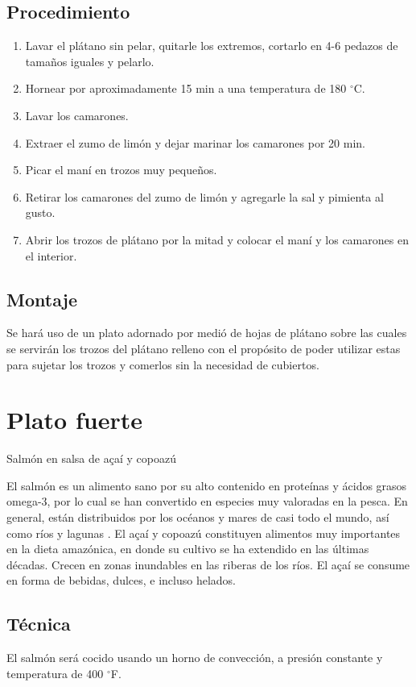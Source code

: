 \documentclass{scrartcl}
\newcommand{\msection}[2]{\section{#1}{\color{Maroon}\fontspec{Zapfino.ttf}\begin{center}#2\end{center}}}
\begin{document}
	\subsection{Procedimiento}
	\begin{multicols}{2}
		\begin{enumerate}
			\item Lavar el plátano sin pelar, quitarle los extremos, cortarlo en 4-6 pedazos de tamaños iguales y pelarlo.
			\item Hornear por aproximadamente 15 min a una temperatura de 180 $^\circ$C.
			\item Lavar los camarones.
			\item Extraer el zumo de limón y dejar marinar los camarones por 20 min.
			\item Picar el maní en trozos muy pequeños.
			\item Retirar los camarones del zumo de limón y agregarle la sal y pimienta al gusto.
			\item Abrir los trozos de plátano por la mitad y colocar el maní y los camarones en el interior.
		\end{enumerate}
	\end{multicols}
	
	\subsection{Montaje}
		Se hará uso de un plato adornado por medió de hojas de plátano sobre las cuales se servirán los trozos del plátano relleno con el propósito de poder utilizar estas para sujetar los trozos y comerlos sin la necesidad de cubiertos.
	
	\msection{Plato fuerte}{Salm\'on en salsa de a\c{c}a\'i y copoazú}
		El salmón es un alimento sano por su alto contenido en proteínas y ácidos grasos omega-3, por lo cual se han convertido en especies muy valoradas en la pesca. En general, est\'an distribuidos por los océanos y mares de casi todo el mundo, as\'i como r\'ios y lagunas \cite{mills1989ecology}. El a\c{c}a\'i y copoazú constituyen alimentos muy importantes en la dieta amazónica, en donde su cultivo se ha extendido en las \'ultimas d\'ecadas. Crecen en zonas inundables en las riberas de los ríos.  El a\c{c}a\'i se consume en forma de bebidas, dulces, e incluso helados. 
	
	\subsection{T\'ecnica}
		El salm\'on ser\'a cocido usando un horno de convecci\'on, a presi\'on constante y temperatura de 400 $^\circ$F.
\end{document}
